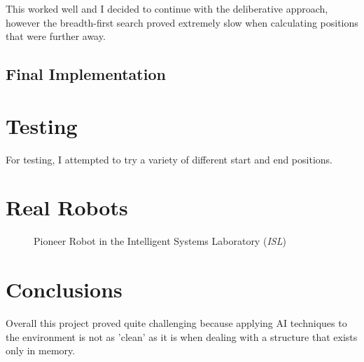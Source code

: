 \documentclass[a4paper,12pt]{article}
\begin{document}
This worked well and I decided to continue with the deliberative approach, however the breadth-first search proved extremely slow when calculating positions that were further away.
\subsection{Final Implementation}

\section{Testing}
For testing, I attempted to try a variety of different start and end positions. 
\section{Real Robots}
\begin{figure}
\begin{center}
    \caption{Pioneer Robot in the Intelligent Systems Laboratory (\textit{ISL})}
\end{center}
\end{figure}
\section{Conclusions}
Overall this project proved quite challenging because applying AI techniques to the environment is not as 'clean' as it is when dealing with a structure that exists only in memory. 
\end{document}
